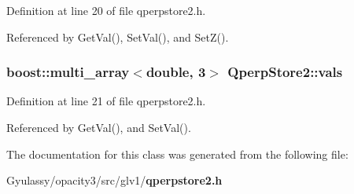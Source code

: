 Definition at line 20 of file qperpstore2.h.

Referenced by GetVal(), SetVal(), and SetZ().
\subsubsection{\setlength{\rightskip}{0pt plus 5cm}boost::multi\_\-array$<$double, 3$>$ {\bf QperpStore2::vals}\hspace{0.3cm}{\tt  [private]}}\label{classQperpStore2_0fa093aaf1c87565a3741584eef5a35c}




Definition at line 21 of file qperpstore2.h.

Referenced by GetVal(), and SetVal().

The documentation for this class was generated from the following file:\begin{CompactItemize}
\item 
Gyulassy/opacity3/src/glv1/{\bf qperpstore2.h}\end{CompactItemize}
